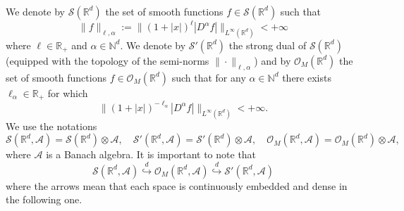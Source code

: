 \documentclass{article}
\newcommand{\assign}{:=}
\begin{document}
\

We denote by $\mathcal{S} (\mathbb{R}^d)$ the set of smooth functions $f \in
\mathcal{S} (\mathbb{R}^d)$ such that
\[ \| f \|_{\ell, \alpha} \assign \| (1 + | x |)^{\ell} | D^{\alpha} f |
   \|_{L^{\infty} (\mathbb{R}^d)} < + \infty \]
where $\ell \in \mathbb{R}_+$ and $\alpha \in \mathbb{N}^d$. We denote by
$\mathcal{S}' (\mathbb{R}^d)$ the strong dual of $\mathcal{S} (\mathbb{R}^d)$
(equipped with the topology of the semi-norms $\| \cdot \|_{\ell, \alpha}$)
and by $\mathcal{O}_M (\mathbb{R}^d)$ the set of smooth functions $f \in
\mathcal{O}_M (\mathbb{R}^d)$ such that for any $\alpha \in \mathbb{N}^d$
there exists $\ell_{\alpha} \in \mathbb{R}_+$ for which
\[ \| (1 + | x |)^{- \ell_{\alpha}} | D^{\alpha} f | \|_{L^{\infty}
   (\mathbb{R}^d)} < + \infty . \]
We use the notations
\[ \mathcal{S} (\mathbb{R}^d, \mathcal{A}) = \mathcal{S} (\mathbb{R}^d)
   \otimes \mathcal{A}, \quad \mathcal{S}' (\mathbb{R}^d, \mathcal{A}) =
   \mathcal{S}' (\mathbb{R}^d) \otimes \mathcal{A}, \quad \mathcal{O}_M
   (\mathbb{R}^d, \mathcal{A}) = \mathcal{O}_M (\mathbb{R}^d) \otimes
   \mathcal{A}, \]
where $\mathcal{A}$ is a Banach algebra. It is important to note that
\[ \mathcal{S} (\mathbb{R}^d, \mathcal{A}) \overset{d}{\hookrightarrow}
   \mathcal{O}_M (\mathbb{R}^d, \mathcal{A}) \overset{d}{\hookrightarrow}
   \mathcal{S}' (\mathbb{R}^d, \mathcal{A}) \]
where the arrows mean that each space is continuously embedded and dense in
the following one.
\end{document}
